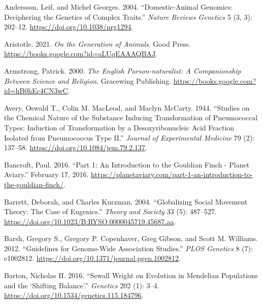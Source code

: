 \documentclass[
]{book}
\newlength{\cslhangindent}
\newlength{\cslentryspacingunit} %
\newenvironment{CSLReferences}[2] %
 {%
  \setlength{\parindent}{0pt}
  \ifodd #1
  \let\oldpar\par
  \def\par{\hangindent=\cslhangindent\oldpar}
  \fi
  \setlength{\parskip}{#2\cslentryspacingunit}
 }%
 {}
\begin{document}
\begin{CSLReferences}{1}{0}
\leavevmode{}%
Andersson, Leif, and Michel Georges. 2004. {``Domestic-Animal Genomics: Deciphering the Genetics of Complex Traits.''} \emph{Nature Reviews Genetics} 5 (3, 3): 202--12. \url{https://doi.org/10.1038/nrg1294}.

\leavevmode{}%
Aristotle. 2021. \emph{On the {Generation} of {Animals}}. {Good Press}. \url{https://books.google.com?id=aLUqEAAAQBAJ}.

\leavevmode{}%
Armstrong, Patrick. 2000. \emph{The {English Parson-naturalist}: {A Companionship Between Science} and {Religion}}. {Gracewing Publishing}. \url{https://books.google.com?id=hB0hEc4CN3wC}.

\leavevmode{}%
Avery, Oswald T., Colin M. MacLeod, and Maclyn McCarty. 1944. {``Studies on the Chemical Nature of the Substance Inducing Transformation of Pneumococcal Types: {Induction} of Transformation by a Desoxyribonucleic Acid Fraction Isolated from Pneumococcus Type {II}.''} \emph{Journal of Experimental Medicine} 79 (2): 137--58. \url{https://doi.org/10.1084/jem.79.2.137}.

\leavevmode{}%
Bancroft, Paul. 2016. {``Part 1: {An} Introduction to the {Gouldian} Finch - {Planet Aviary}.''} February 17, 2016. \url{https://planetaviary.com/part-1-an-introduction-to-the-gouldian-finch/}.

\leavevmode{}%
Barrett, Deborah, and Charles Kurzman. 2004. {``Globalizing Social Movement Theory: {The} Case of Eugenics.''} \emph{Theory and Society} 33 (5): 487--527. \url{https://doi.org/10.1023/B:RYSO.0000045719.45687.aa}.

\leavevmode{}%
Barsh, Gregory S., Gregory P. Copenhaver, Greg Gibson, and Scott M. Williams. 2012. {``Guidelines for {Genome-Wide Association Studies}.''} \emph{PLOS Genetics} 8 (7): e1002812. \url{https://doi.org/10.1371/journal.pgen.1002812}.

\leavevmode{}%
Barton, Nicholas H. 2016. {``Sewall {Wright} on {Evolution} in {Mendelian Populations} and the {`{Shifting Balance}'}.''} \emph{Genetics} 202 (1): 3--4. \url{https://doi.org/10.1534/genetics.115.184796}.


\end{CSLReferences}
\end{document}
